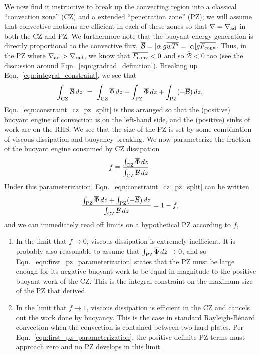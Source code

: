 \documentclass[twocolumn]{aastex631}
\newcommand{\gradrad}{\ensuremath{\nabla_{\rm{rad}}}}
\newcommand{\gradad}{\ensuremath{\nabla_{\rm{ad}}}}
\newcommand{\justgrad}{\ensuremath{\nabla}}
\newcommand{\Fconv}{\ensuremath{F_{\rm{conv}}}}
\renewcommand{\bar}[1]{\overline{#1}}
\begin{document}
We now find it instructive to break up the convecting region into a classical ``convection zone'' (CZ) and a extended ``penetration zone'' (PZ); we will assume that convective motions are efficient in each of these zones so that $\justgrad = \gradad$ in both the CZ and PZ.
We furthermore note that the buoyant energy generation is directly proportional to the convective flux, $\bar{\mathcal{B}} = |\alpha|g\bar{w T'} = |\alpha| g \bar{\Fconv}$.
Thus, in the PZ where $\gradad > \gradrad$, we know that $\bar{\Fconv} < 0$ and so $\bar{\mathcal{B}} < 0$ too (see the discussion around Eqn.~\ref{eqn:gradrad_definition}).
Breaking up Eqn.~\ref{eqn:integral_constraint}, we see that
\begin{equation}
\int_{\rm{CZ}} \bar{\mathcal{B}}\,dz \,\,=\,\,
\int_{\rm{CZ}} \bar{\Phi}\,dz + \int_{\rm{PZ}} \bar{\Phi}\,dz + \int_{\rm{PZ}}(-\bar{\mathcal{B}})\,dz.
\label{eqn:constraint_cz_pz_split}
\end{equation}
Eqn.~\ref{eqn:constraint_cz_pz_split} is thus arranged so that the (positive) buoyant engine of convection is on the left-hand side, and the (positive) sinks of work are on the RHS.
We see that the size of the PZ is set by some combination of viscous dissipation and buoyancy breaking.
We now parameterize the fraction of the buoyant engine consumed by CZ dissipation  
\begin{equation}
f \equiv \frac{\int_{\rm{CZ}} \bar{\Phi}\,dz}{\int_{\rm{CZ}}\bar{\mathcal{B}}\,dz}.
\label{eqn:f_defn}
\end{equation}
Under this parameterization, Eqn.~\ref{eqn:constraint_cz_pz_split} can be written
\begin{equation}
\frac{\int_{\rm{PZ}} \bar{\Phi}\,dz + \int_{\rm{PZ}}(-\bar{\mathcal{B}})\,dz}{\int_{\rm{CZ}} \bar{\mathcal{B}}\,dz}
= 1 - f,
\label{eqn:first_pz_parameterization}
\end{equation}
and we can immediately read off limits on a hypothetical PZ according to $f$,
\begin{enumerate}
\item In the limit that $f \rightarrow 0$, viscous dissipation is extremely inefficient.
It is probably also reasonable to assume that $\int_{\rm{PZ}}\bar{\Phi}\,dz \rightarrow 0$, and so Eqn.~\ref{eqn:first_pz_parameterization} states that the PZ must be large enough for its negative buoyant work to be equal in magnitude to the positive buoyant work of the CZ.
This is the integral constraint on the maximum size of the PZ that \citet{roxburgh1989} derived.
\item In the limit that $f \rightarrow 1$, viscous dissipation is efficient in the CZ and cancels out the work done by buoyancy.
This is the case in standard Rayleigh-B\'{e}nard convection when the convection is contained between two hard plates.
Per Eqn.~\ref{eqn:first_pz_parameterization}, the positive-definite PZ terms must approach zero and no PZ develops in this limit.
\end{enumerate}
\end{document}
